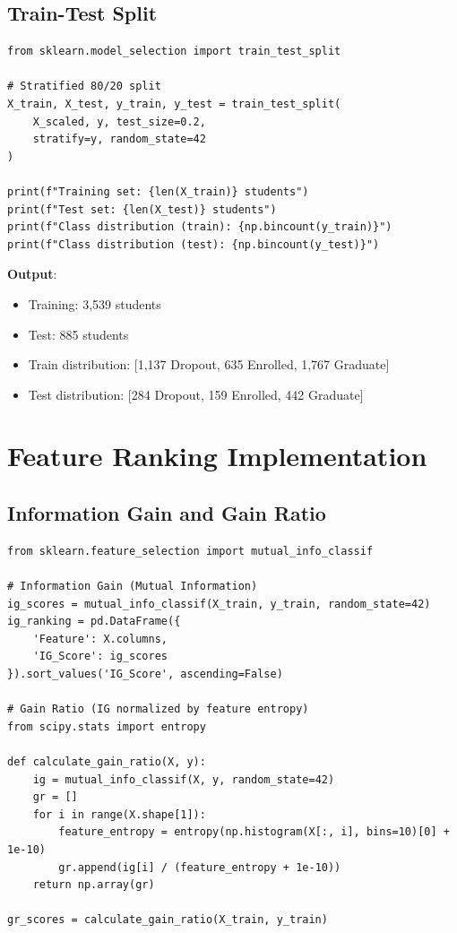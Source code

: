 \subsection{Train-Test Split}

\begin{verbatim}
from sklearn.model_selection import train_test_split

# Stratified 80/20 split
X_train, X_test, y_train, y_test = train_test_split(
    X_scaled, y, test_size=0.2, 
    stratify=y, random_state=42
)

print(f"Training set: {len(X_train)} students")
print(f"Test set: {len(X_test)} students")
print(f"Class distribution (train): {np.bincount(y_train)}")
print(f"Class distribution (test): {np.bincount(y_test)}")
\end{verbatim}

\textbf{Output}:
\begin{itemize}
\item Training: 3,539 students
\item Test: 885 students
\item Train distribution: [1,137 Dropout, 635 Enrolled, 1,767 Graduate]
\item Test distribution: [284 Dropout, 159 Enrolled, 442 Graduate]
\end{itemize}

\section{Feature Ranking Implementation}

\subsection{Information Gain and Gain Ratio}

\begin{verbatim}
from sklearn.feature_selection import mutual_info_classif

# Information Gain (Mutual Information)
ig_scores = mutual_info_classif(X_train, y_train, random_state=42)
ig_ranking = pd.DataFrame({
    'Feature': X.columns,
    'IG_Score': ig_scores
}).sort_values('IG_Score', ascending=False)

# Gain Ratio (IG normalized by feature entropy)
from scipy.stats import entropy

def calculate_gain_ratio(X, y):
    ig = mutual_info_classif(X, y, random_state=42)
    gr = []
    for i in range(X.shape[1]):
        feature_entropy = entropy(np.histogram(X[:, i], bins=10)[0] + 1e-10)
        gr.append(ig[i] / (feature_entropy + 1e-10))
    return np.array(gr)

gr_scores = calculate_gain_ratio(X_train, y_train)
\end{verbatim}

